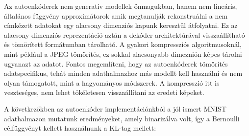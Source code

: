 \documentclass[12pt, english]{article}
\begin{document}
\par Az autoenkóderek nem generatív modellek önmagukban, hanem nem lineáris, általános függvény approximátorok amik megtanulják rekonstruálni a nem címkézett adatokat egy alacsony dimenziós kapunk keresztül átfolyatni. Ez az alacsony dimenziós reprezentáció aztán a dekóder architektúrával visszaállítható és tömörített formátumban tárolható. A gyakori kompressziós algoritmusoknál, mint például a JPEG tömörítés, ez sokkal alacsonyabb dimeznión képes tárolni ugyanazt az adatot. Fontos megemlíteni, hogy az autoenkóderek tömörítés adatspecifikus, tehát minden adathalmazhoz más modellt kell használni és nem olyan támogatott, mint a hagyományos módszerek. A kompresszió itt is veszteséges, nem lehet tökéletesen visszaállítani az eredeti képeket.

\vspace{4mm}

\par A következőkben az autoenkóder implementációnkból a jól ismert MNIST adathalmazon mutatunk eredményeket, amely binarizálva volt, így a Bernoulli célfüggvényt kellett használnunk a KL-tag mellett:

\vspace{4mm}
\end{document}
